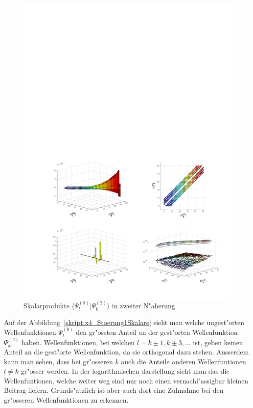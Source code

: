 \begin{refsection}
\begin{figure}	%
\centering
\includegraphics[width=1.0\textwidth]{anharmonisch/images/x4/Stoerung2Skalare.pdf}
\caption{Skalarprodukte $\langle\Psi_l^{(0)}|\Psi_k^{(2)}\rangle$ in zweiter N"aherung
\label{skript:x4_Stoerung2Skalare}}
\end{figure}

Auf der Abbildung~\ref{skript:x4_Stoerung1Skalare} sieht man welche ungest"orten Wellenfunktionen $\Psi_l^{(0)}$ den gr"ossten Anteil an der gest"orten Wellenfunktion $\Psi_k^{(2)}$ haben. Wellenfunktionen, bei welchen $l=k\pm 1,k\pm 3,\dots$ ist, geben keinen Anteil an die gest"orte Wellenfunktion, da sie orthogonal dazu stehen. Ausserdem kann man sehen, dass bei gr"osseren $k$ auch die Anteile anderen Wellenfuntionen $l\neq k$ gr"osser werden. In der logarithmischen darstellung sieht man das die Wellenfuntionen, welche weiter weg sind nur noch einen vernachl"assigbar kleinen Beitrag liefern. Grunds"atzlich ist aber auch dort eine Zuhnahme bei den gr"osseren Wellenfunktionen zu erkennen.


\end{refsection}
